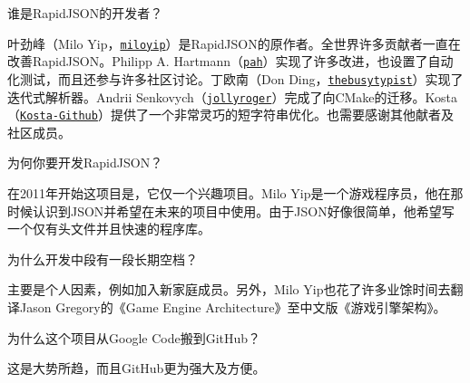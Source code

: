 \begin{DoxyEnumerate}
\item 谁是\+Rapid\+J\+S\+O\+N的开发者？

叶劲峰（\+Milo Yip，\href{https://github.com/miloyip}{\tt miloyip}）是\+Rapid\+J\+S\+O\+N的原作者。全世界许多贡献者一直在改善\+Rapid\+J\+S\+O\+N。\+Philipp A. Hartmann（\href{https://github.com/pah}{\tt pah}）实现了许多改进，也设置了自动化测试，而且还参与许多社区讨论。丁欧南（\+Don Ding，\href{https://github.com/thebusytypist}{\tt thebusytypist}）实现了迭代式解析器。\+Andrii Senkovych（\href{https://github.com/jollyroger}{\tt jollyroger}）完成了向\+C\+Make的迁移。\+Kosta（\href{https://github.com/Kosta-Github}{\tt Kosta-\/\+Github}）提供了一个非常灵巧的短字符串优化。也需要感谢其他献者及社区成员。
\item 为何你要开发\+Rapid\+J\+S\+O\+N？

在2011年开始这项目是，它仅一个兴趣项目。\+Milo Yip是一个游戏程序员，他在那时候认识到\+J\+S\+O\+N并希望在未来的项目中使用。由于\+J\+S\+O\+N好像很简单，他希望写一个仅有头文件并且快速的程序库。
\item 为什么开发中段有一段长期空档？

主要是个人因素，例如加入新家庭成员。另外，\+Milo Yip也花了许多业馀时间去翻译\+Jason Gregory的《\+Game Engine Architecture》至中文版《游戏引擎架构》。
\item 为什么这个项目从\+Google Code搬到\+Git\+Hub？

这是大势所趋，而且\+Git\+Hub更为强大及方便。 
\end{DoxyEnumerate}